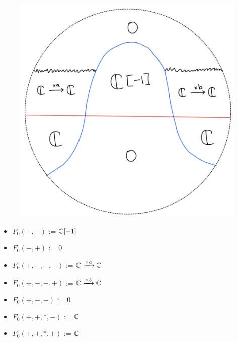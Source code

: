 \begin{figure}[H]
    \centering
    \includegraphics[scale = 0.45]{diagrams/lemma2/28.png} 
    \caption{}
    \label{fig:your-label}
\end{figure}
\begin{itemize}
\item $F_0(-,-)$ := $\mathbb{C}[-1]$
\item $F_0(-,+)$ := $0$
\item $F_0(+,-,-,-)$ := $\mathbb{C} \xrightarrow{\times a} \mathbb{C} $
\item $F_0(+,-,-,+)$ := $\mathbb{C} \xrightarrow{\times b} \mathbb{C} $
\item $F_0(+,-,+)$ := $0$
\item $F_0(+,+,*,-)$ := $\mathbb{C}$
\item $F_0(+,+,*,+)$ := $\mathbb{C}$
\end{itemize}

